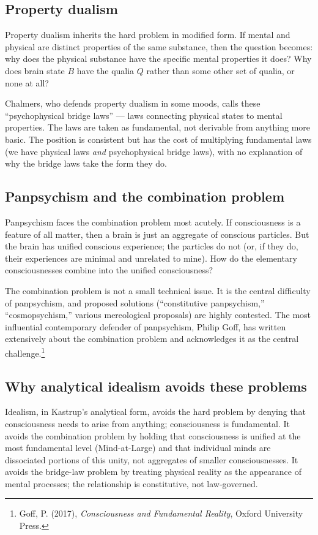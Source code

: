 \subsection{Property dualism}

Property dualism inherits the hard problem in modified form. If
mental and physical are distinct properties of the same substance,
then the question becomes: why does the physical substance have the
specific mental properties it does? Why does brain state $B$ have
the qualia $Q$ rather than some other set of qualia, or none at all?

Chalmers, who defends property dualism in some moods, calls these
``psychophysical bridge laws'' --- laws connecting physical states
to mental properties. The laws are taken as fundamental, not
derivable from anything more basic. The position is consistent but
has the cost of multiplying fundamental laws (we have physical laws
\emph{and} psychophysical bridge laws), with no explanation of why
the bridge laws take the form they do.

\subsection{Panpsychism and the combination problem}

Panpsychism faces the combination problem most acutely. If
consciousness is a feature of all matter, then a brain is just an
aggregate of conscious particles. But the brain has unified conscious
experience; the particles do not (or, if they do, their experiences
are minimal and unrelated to mine). How do the elementary
consciousnesses combine into the unified consciousness?

The combination problem is not a small technical issue. It is the
central difficulty of panpsychism, and proposed solutions
(``constitutive panpsychism,'' ``cosmopsychism,'' various
mereological proposals) are highly contested. The most influential
contemporary defender of panpsychism, Philip Goff, has written
extensively about the combination problem and acknowledges it as
the central challenge.\footnote{Goff, P. (2017), \emph{Consciousness
and Fundamental Reality}, Oxford University Press.}

\subsection{Why analytical idealism avoids these problems}

Idealism, in Kastrup's analytical form, avoids the hard problem by
denying that consciousness needs to arise from anything; consciousness
is fundamental. It avoids the combination problem by holding that
consciousness is unified at the most fundamental level (Mind-at-Large)
and that individual minds are dissociated portions of this unity,
not aggregates of smaller consciousnesses. It avoids the bridge-law
problem by treating physical reality as the appearance of mental
processes; the relationship is constitutive, not law-governed.

